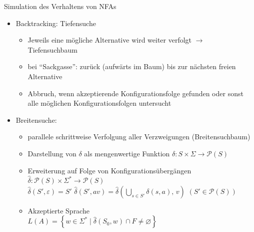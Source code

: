 \begin{frame}{Simulation des Verhaltens von NFAs}
	\begin{itemize}
		\item Backtracking: Tiefensuche
		\begin{itemize}
			\item Jeweils eine mögliche Alternative wird weiter verfolgt $\rightarrow$ Tiefensuchbaum
			\item bei "`Sackgasse"': zurück (aufwärts im Baum) bis zur nächsten freien Alternative
			\item Abbruch, wenn akzeptierende Konfigurationsfolge gefunden oder sonst alle möglichen Konfigurationsfolgen untersucht
		\end{itemize}
		\item Breitensuche:
		\begin{itemize}
			\item parallele schrittweise Verfolgung aller Verzweigungen (Breitensuchbaum)
			\item Darstellung von $\delta$ als mengenwertige Funktion $\delta: S \times \Sigma \rightarrow \mathcal{P}(S)$
			\item Erweiterung auf Folge von Konfigurationsübergängen\\
			\quad $\hat{\delta}: \mathcal{P}(S) \times \Sigma^* \rightarrow \mathcal{P}(S)$\\
			\quad $\hat{\delta}(S', \varepsilon) = S'$ \quad $\hat{\delta}(S', av)=\hat{\delta}\left(\bigcup_{s \in S'} \delta(s,a),\,v\right)$ \quad $(S' \in \mathcal{P}(S))$
			\item Akzeptierte Sprache\\
			\quad $L(A)=\left\{w \in \Sigma^* \mid \hat{\delta}(S_0,w)\cap F \neq \varnothing\right\}$
		\end{itemize}
	\end{itemize}
\end{frame}

